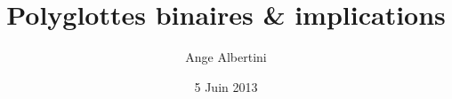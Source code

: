 \documentclass{beamer}
\title[Polyglottes binaires \& implications]{Polyglottes binaires \& implications}
\author{Ange Albertini}
\institute{Corkami}
\date{5 Juin 2013}
\begin{document}
\begin{frame}
\titlepage
\end{frame}
\end{document}
